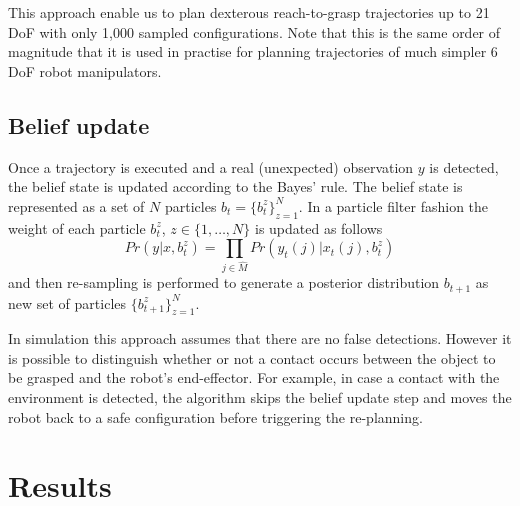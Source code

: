 This approach enable us to plan dexterous reach-to-grasp trajectories up to 21 DoF with only 1,000 sampled configurations. Note that this is the same order of magnitude that it is used in practise for planning trajectories of much simpler 6 DoF robot manipulators. 

\subsection{Belief update}

Once a trajectory is executed and a real (unexpected) observation $y$ is detected, the belief state is updated according to the Bayes' rule. The belief state is represented as a set of $N$ particles $b_t=\{b_t^z\}_{z=1}^{N}$. In a particle filter fashion the weight of each particle $b_t^z$, $z\in\{1,\ldots,N\}$ is updated as follows
$$
Pr(y|x, b_t^z)=\prod_{j\in\hat{M}}{Pr(y_{t}(j)|x_{t}(j),b_t^z)}
$$
and then re-sampling is performed to generate a posterior distribution $b_{t+1}$ as new set of particles $\{b_{t+1}^z\}_{z=1}^{N}$.

In simulation this approach assumes that there are no false detections. However it is possible to distinguish whether or not a contact occurs between the object to be grasped and the robot's end-effector. For example, in case a contact with the environment is detected, the algorithm skips the belief update step and moves the robot back to a safe configuration before triggering the re-planning.



\section{Results}\label{sec:ch06:results}

